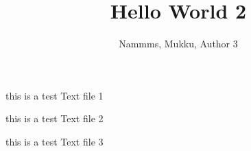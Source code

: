 \documentclass{article}
\title{Hello World 2}
\author{Nammms, Mukku, Author 3}
\begin{document}
\maketitle



this is a test Text file 1



this is a test Text file 2



this is a test Text file 3
\end{document}
